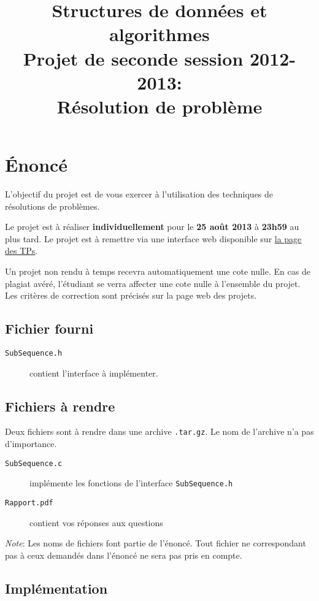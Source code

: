 \documentclass[a4paper,10pt]{article}
\title{
    \textbf{Structures de données et algorithmes}\\
    Projet de seconde session 2012-2013:\\Résolution de problème
}
\date{}
\begin{document}
\maketitle

\section*{\'Enoncé}

L'objectif du projet est de vous exercer à l'utilisation des techniques de résolutions de problèmes.

Le projet est à réaliser {\bf individuellement} pour le {\bf 25 août
  2013} à {\bf 23h59} au plus tard. Le projet est à remettre via une
interface web disponible sur
\href{http://www.montefiore.ulg.ac.be/~glouppe/2012-2013/students.info0902.php}{la
  page des TPs}.

Un projet non rendu à temps recevra automatiquement une cote nulle. En cas de
plagiat avéré, l'étudiant se verra affecter une cote nulle à l'ensemble du
projet. Les critères de correction sont précisés sur la page web des projets.

\subsection*{Fichier fourni}
\begin{description}
\item[\texttt{SubSequence.h}] contient l'interface à implémenter.
\end{description}
\subsection*{Fichiers à rendre}
Deux fichiers sont à rendre dans une archive \texttt{.tar.gz}. Le nom de l'archive n'a pas d'importance.
\begin{description}
\item[\texttt{SubSequence.c}] implémente les fonctions de l'interface \texttt{SubSequence.h}
\item[\texttt{Rapport.pdf}] contient vos réponses aux questions
\end{description}

{\em Note}: Les noms de fichiers font partie de l'énoncé. Tout fichier ne
correspondant pas à ceux demandés dans l'énoncé ne sera pas pris en compte.

\subsection*{Implémentation}
\end{document}
